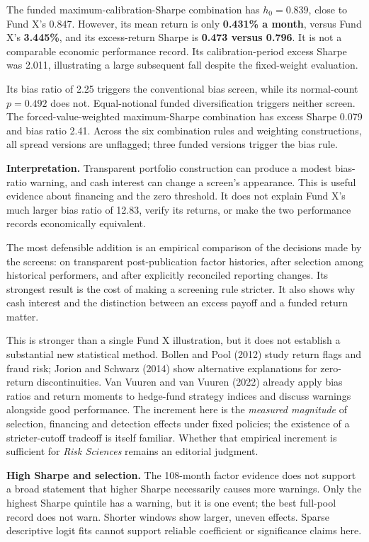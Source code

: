 \documentclass[11pt,letterpaper]{article}
\newcommand{\subhead}[1]{\vspace{5pt}{\large\bfseries #1}\par}
\begin{document}
The funded maximum-calibration-Sharpe combination has $h_0=0.839$, close to Fund X's 0.847. However, its mean return is only \textbf{0.431\% a month}, versus Fund X's \textbf{3.445\%}, and its excess-return Sharpe is \textbf{0.473 versus 0.796}. It is not a comparable economic performance record. Its calibration-period excess Sharpe was 2.011, illustrating a large subsequent fall despite the fixed-weight evaluation.

Its bias ratio of 2.25 triggers the conventional bias screen, while its normal-count $p=0.492$ does not. Equal-notional funded diversification triggers neither screen. The forced-value-weighted maximum-Sharpe combination has excess Sharpe 0.079 and bias ratio 2.41. Across the six combination rules and weighting constructions, all spread versions are unflagged; three funded versions trigger the bias rule.

\textbf{Interpretation.} Transparent portfolio construction can produce a modest bias-ratio warning, and cash interest can change a screen's appearance. This is useful evidence about financing and the zero threshold. It does not explain Fund X's much larger bias ratio of 12.83, verify its returns, or make the two performance records economically equivalent.

\newpage
\subhead{What this adds to the paper}
The most defensible addition is an empirical comparison of the decisions made by the screens: on transparent post-publication factor histories, after selection among historical performers, and after explicitly reconciled reporting changes. Its strongest result is the cost of making a screening rule stricter. It also shows why cash interest and the distinction between an excess payoff and a funded return matter.

This is stronger than a single Fund X illustration, but it does not establish a substantial new statistical method. Bollen and Pool (2012) study return flags and fraud risk; Jorion and Schwarz (2014) show alternative explanations for zero-return discontinuities. Van Vuuren and van Vuuren (2022) already apply bias ratios and return moments to hedge-fund strategy indices and discuss warnings alongside good performance. The increment here is the \emph{measured magnitude} of selection, financing and detection effects under fixed policies; the existence of a stricter-cutoff tradeoff is itself familiar. Whether that empirical increment is sufficient for \emph{Risk Sciences} remains an editorial judgment.

\subhead{Changes to the proposed hypotheses}
\textbf{High Sharpe and selection.} The 108-month factor evidence does not support a broad statement that higher Sharpe necessarily causes more warnings. Only the highest Sharpe quintile has a warning, but it is one event; the best full-pool record does not warn. Shorter windows show larger, uneven effects. Sparse descriptive logit fits cannot support reliable coefficient or significance claims here.
\end{document}
